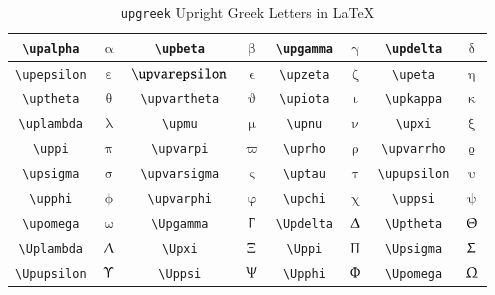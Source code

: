 \begin{table}
\caption{\texttt{upgreek} Upright Greek Letters in \LaTeX}
\begin{center}
\begin{tabular}{|c|c|c|c|c|c|c|c|} \hline
\verb"\upalpha"  & $\upalpha$ & \verb"\upbeta" & $\upbeta$ & \verb"\upgamma" & $\upgamma$ & \verb"\updelta" & $\updelta$  \bigstrut \\ \hline
\verb"\upepsilon"  & $\upepsilon$ & $\verb"\upvarepsilon"$ & $\upvarepsilon$ & \verb"\upzeta" & $\upzeta$ & \verb"\upeta" & $\upeta$   \bigstrut \\ \hline
\verb"\uptheta"  & $\uptheta$ & \verb"\upvartheta" & $\upvartheta$ & \verb"\upiota" & $\upiota$ & \verb"\upkappa" & $\upkappa$   \bigstrut \\ \hline
\verb"\uplambda"  & $\uplambda$ & \verb"\upmu" & $\upmu$ & \verb"\upnu" & $\upnu$ & \verb"\upxi" & $\upxi$   \bigstrut \\ \hline
\verb"\uppi"  & $\uppi$ & \verb"\upvarpi" & $\upvarpi$ & \verb"\uprho" & $\uprho$ & \verb"\upvarrho" & $\upvarrho$   \bigstrut \\ \hline
\verb"\upsigma"  & $\upsigma$ & \verb"\upvarsigma" & $\upvarsigma$ & \verb"\uptau"  & $\uptau$ & \verb"\upupsilon" & $\upupsilon$   \bigstrut \\ \hline
\verb"\upphi"  & $\upphi$ & \verb"\upvarphi"  & $\upvarphi$ & \verb"\upchi" & $\upchi$ & \verb"\uppsi" & $\uppsi$   \bigstrut \\ \hline
\verb"\upomega"  & $\upomega$ & \verb"\Upgamma"  & $\Upgamma$  & \verb"\Updelta"  & $\Updelta$  & \verb"\Uptheta"  & $\Uptheta$ \bigstrut \\ \hline
\verb"\Uplambda"  & $\Uplambda$  & \verb"\Upxi"  & $\Upxi$  & \verb"\Uppi"  & $\Uppi$  & \verb"\Upsigma"  & $\Upsigma$ \bigstrut \\ \hline
\verb"\Upupsilon"  & $\Upupsilon$  & \verb"\Uppsi"  &  $\Uppsi$  & \verb"\Upphi"  & $\Upphi$  & \verb"\Upomega"  & $\Upomega$ \bigstrut \\ \hline
\end{tabular}
\end{center}
\label{tab_math_5}
\end{table}





